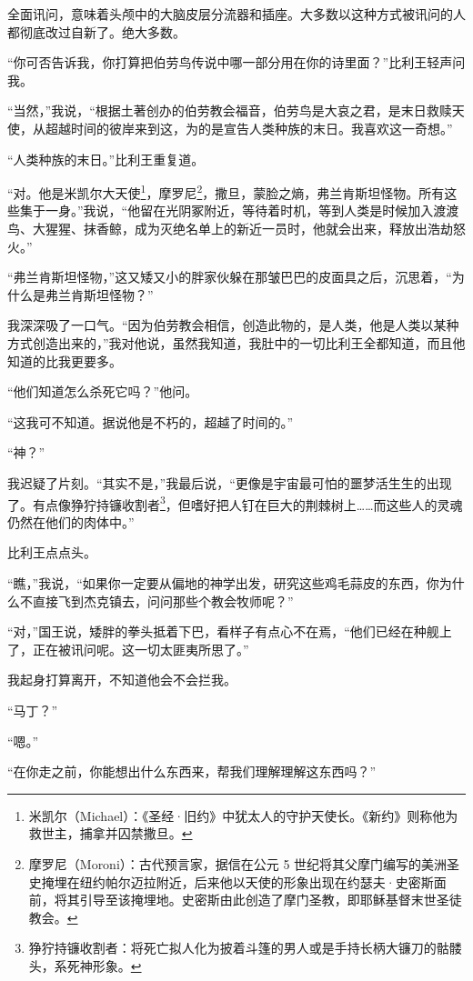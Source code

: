 \documentclass[AutoFakeBold=true]{book}
\begin{document}
全面讯问，意味着头颅中的大脑皮层分流器和插座。大多数以这种方式被讯问的人都彻底改过自新了。绝大多数。

``你可否告诉我，你打算把伯劳鸟传说中哪一部分用在你的诗里面？''比利王轻声问我。

``当然，''我说，``根据土著创办的伯劳教会福音，伯劳鸟是大哀之君，是末日救赎天使，从超越时间的彼岸来到这，为的是宣告人类种族的末日。我喜欢这一奇想。''

``人类种族的末日。''比利王重复道。

``对。他是米凯尔大天使\footnote{米凯尔（Michael）：《圣经·旧约》中犹太人的守护天使长。《新约》则称他为救世主，捕拿并囚禁撒旦。}，摩罗尼\footnote{摩罗尼（Moroni）：古代预言家，据信在公元 5 世纪将其父摩门编写的美洲圣史掩埋在纽约帕尔迈拉附近，后来他以天使的形象出现在约瑟夫·史密斯面前，将其引导至该掩埋地。史密斯由此创造了摩门圣教，即耶稣基督末世圣徒教会。}，撒旦，蒙脸之熵，弗兰肯斯坦怪物。所有这些集于一身。''我说，``他留在光阴冢附近，等待着时机，等到人类是时候加入渡渡鸟、大猩猩、抹香鲸，成为灭绝名单上的新近一员时，他就会出来，释放出浩劫怒火。''

``弗兰肯斯坦怪物，''这又矮又小的胖家伙躲在那皱巴巴的皮面具之后，沉思着，``为什么是弗兰肯斯坦怪物？''

我深深吸了一口气。``因为伯劳教会相信，创造此物的，是人类，他是人类以某种方式创造出来的，''我对他说，虽然我知道，我肚中的一切比利王全都知道，而且他知道的比我更要多。

``他们知道怎么杀死它吗？''他问。

``这我可不知道。据说他是不朽的，超越了时间的。''

``神？''

我迟疑了片刻。``其实不是，''我最后说，``更像是宇宙最可怕的噩梦活生生的出现了。有点像狰狞持镰收割者\footnote{狰狞持镰收割者：将死亡拟人化为披着斗篷的男人或是手持长柄大镰刀的骷髅头，系死神形象。}，但嗜好把人钉在巨大的荆棘树上……而这些人的灵魂仍然在他们的肉体中。''

比利王点点头。

``瞧，''我说，``如果你一定要从偏地的神学出发，研究这些鸡毛蒜皮的东西，你为什么不直接飞到杰克镇去，问问那些个教会牧师呢？''

``对，''国王说，矮胖的拳头抵着下巴，看样子有点心不在焉，``他们已经在种舰上了，正在被讯问呢。这一切太匪夷所思了。''

我起身打算离开，不知道他会不会拦我。

``马丁？''

``嗯。''

``在你走之前，你能想出什么东西来，帮我们理解理解这东西吗？''
\end{document}
